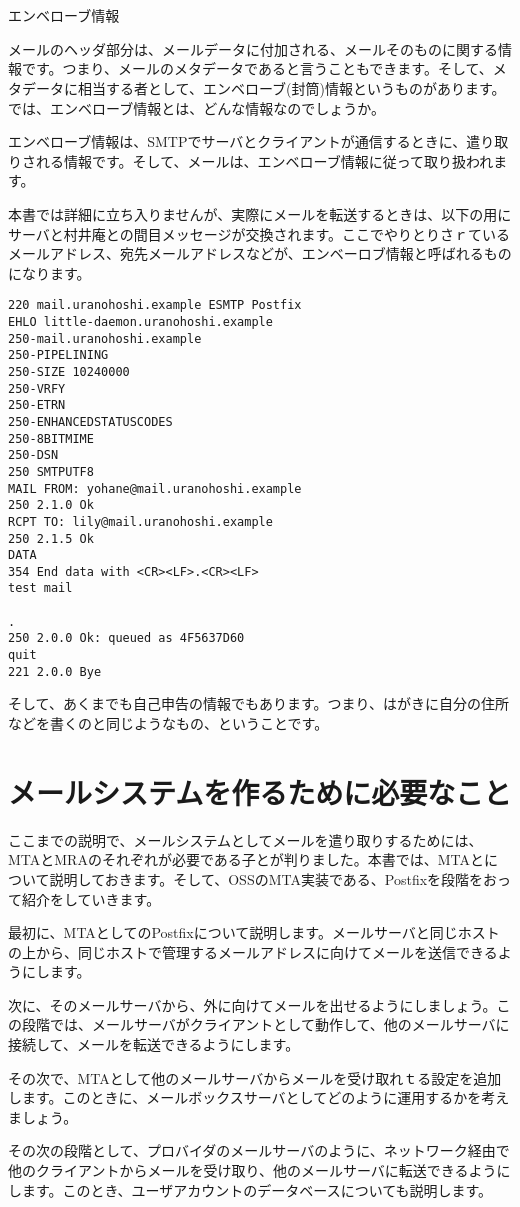 \section*{}
\begin{itembox}[]{エンベローブ情報}

メールのヘッダ部分は、メールデータに付加される、メールそのものに関する情報です。つまり、メールのメタデータであると言うこともできます。そして、メタデータに相当する者として、エンベローブ(封筒)情報というものがあります。
では、エンベローブ情報とは、どんな情報なのでしょうか。

エンベローブ情報は、SMTPでサーバとクライアントが通信するときに、遣り取りされる情報です。そして、メールは、エンベローブ情報に従って取り扱われます。

本書では詳細に立ち入りませんが、実際にメールを転送するときは、以下の用にサーバと村井庵との間目メッセージが交換されます。ここでやりとりさｒているメールアドレス、宛先メールアドレスなどが、エンベーロブ情報と呼ばれるものになります。

\begin{verbatim}
220 mail.uranohoshi.example ESMTP Postfix
EHLO little-daemon.uranohoshi.example
250-mail.uranohoshi.example
250-PIPELINING
250-SIZE 10240000
250-VRFY
250-ETRN
250-ENHANCEDSTATUSCODES
250-8BITMIME
250-DSN
250 SMTPUTF8
MAIL FROM: yohane@mail.uranohoshi.example
250 2.1.0 Ok
RCPT TO: lily@mail.uranohoshi.example
250 2.1.5 Ok
DATA
354 End data with <CR><LF>.<CR><LF>
test mail

.
250 2.0.0 Ok: queued as 4F5637D60
quit
221 2.0.0 Bye
\end{verbatim}


そして、あくまでも自己申告の情報でもあります。つまり、はがきに自分の住所などを書くのと同じようなもの、ということです。

\end{itembox}


\section{メールシステムを作るために必要なこと}

ここまでの説明で、メールシステムとしてメールを遣り取りするためには、MTAとMRAのそれぞれが必要である子とが判りました。本書では、MTAとについて説明しておきます。そして、OSSのMTA実装である、Postfixを段階をおって紹介をしていきます。

最初に、MTAとしてのPostfixについて説明します。メールサーバと同じホストの上から、同じホストで管理するメールアドレスに向けてメールを送信できるようにします。

次に、そのメールサーバから、外に向けてメールを出せるようにしましょう。この段階では、メールサーバがクライアントとして動作して、他のメールサーバに接続して、メールを転送できるようにします。


その次で、MTAとして他のメールサーバからメールを受け取れｔる設定を追加します。このときに、メールボックスサーバとしてどのように運用するかを考えましょう。

その次の段階として、プロバイダのメールサーバのように、ネットワーク経由で他のクライアントからメールを受け取り、他のメールサーバに転送できるようにします。このとき、ユーザアカウントのデータベースについても説明します。

